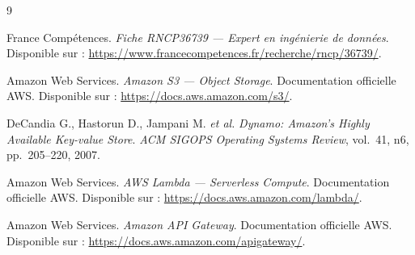 \documentclass[11pt]{article}
\begin{document}
\begin{thebibliography}{9}

France Compétences.
\textit{Fiche RNCP36739 --- Expert en ingénierie de données}.
Disponible sur : \url{https://www.francecompetences.fr/recherche/rncp/36739/}.

Amazon Web Services.
\textit{Amazon S3 --- Object Storage}. Documentation officielle AWS.
Disponible sur : \url{https://docs.aws.amazon.com/s3/}.

DeCandia G., Hastorun D., Jampani M. \textit{et al.}
\textit{Dynamo: Amazon's Highly Available Key-value Store}.
\textit{ACM SIGOPS Operating Systems Review}, vol.~41, n\textdegree{}6,
pp.~205--220, 2007.

Amazon Web Services.
\textit{AWS Lambda --- Serverless Compute}. Documentation officielle AWS.
Disponible sur : \url{https://docs.aws.amazon.com/lambda/}.

Amazon Web Services.
\textit{Amazon API Gateway}. Documentation officielle AWS.
Disponible sur : \url{https://docs.aws.amazon.com/apigateway/}.

\end{thebibliography}
\end{document}
